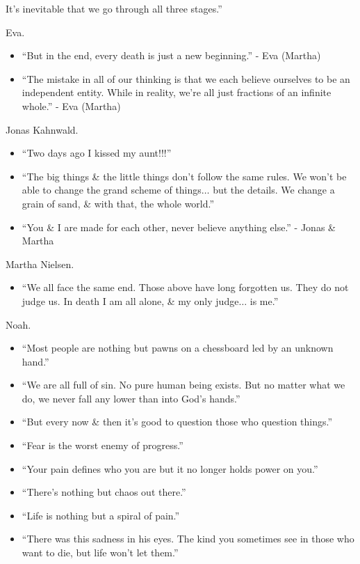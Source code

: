 \documentclass{article}
\begin{document}
\begin{enumerate}
\begin{itemize}
		It's inevitable that we go through all three stages.''
	\end{itemize}
	{\sc Eva.}
	\begin{itemize}
		\item ``But in the end, every death is just a new beginning.'' - Eva (Martha)
		\item ``The mistake in all of our thinking is that we each believe ourselves to be an independent entity. While in reality, we're all just fractions of an infinite whole.'' - Eva (Martha)
	\end{itemize}
	{\sc Jonas Kahnwald.}
	\begin{itemize}
		\item ``Two days ago I kissed my aunt!!!''
		\item ``The big things \& the little things don't follow the same rules. We won't be able to change the grand scheme of things$\ldots$ but the details. We change a grain of sand, \& with that, the whole world.''
		\item ``You \& I are made for each other, never believe anything else.'' - Jonas \& Martha
	\end{itemize}
	{\sc Martha Nielsen.}
	\begin{itemize}
		\item ``We all face the same end. Those above have long forgotten us. They do not judge us. In death I am all alone, \& my only judge$\ldots$ is me.''
	\end{itemize}
	{\sc Noah.}
	\begin{itemize}
		\item ``Most people are nothing but pawns on a chessboard led by an unknown hand.''
		\item ``We are all full of sin. No pure human being exists. But no matter what we do, we never fall any lower than into God's hands.''
		\item ``But every now \& then it's good to question those who question things.''
		\item ``Fear is the worst enemy of progress.''
		\item ``Your pain defines who you are but it no longer holds power on you.''
		\item ``There's nothing but chaos out there.''
		\item ``Life is nothing but a spiral of pain.''
		\item ``There was this sadness in his eyes. The kind you sometimes see in those who want to die, but life won't let them.''
	\end{itemize}

\end{enumerate}
\end{document}
